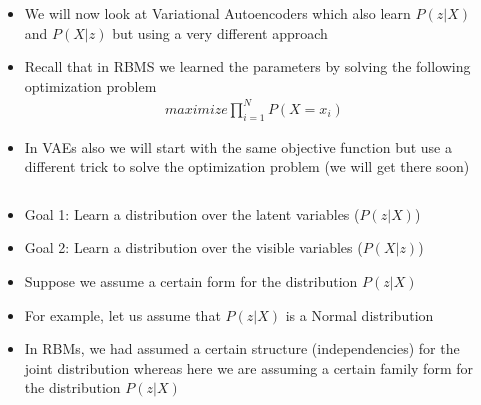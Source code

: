 \documentclass[serif,aspectratio=169,dvipsnames]{beamer}
\begin{document}
\begin{frame}
	\begin{columns}
		\begin{overlayarea}{\textwidth}{\textheight}
			\vspace{3pt}
			
		\end{overlayarea}
		\begin{overlayarea}{\textwidth}{\textheight}
			\begin{itemize}\justifying
				\item<1-> We will now look at Variational Autoencoders which also learn $P(z|X)$ and $P(X|z)$ but using a very different approach
				\item<2-> Recall that in RBMS we learned the parameters by solving the following optimization problem
				\begin{align*}
					maximize \prod_{i=1}^{N} P(X = x_i)
				\end{align*}
				\item<3-> In VAEs also we will start with the same objective function but use a different trick to solve the optimization problem (we will get there soon)
			\end{itemize}
		\end{overlayarea}
	\end{columns}
\end{frame}


\begin{frame}
	\begin{columns}
		\column{0.4\textwidth}
		\begin{overlayarea}{\textwidth}{\textheight}
			\vspace{3pt}
			
		\end{overlayarea}
		\column{0.6\textwidth}
		\begin{overlayarea}{\textwidth}{\textheight}
			\begin{itemize}\justifying
				\item<1-> Goal 1: Learn a distribution over the latent variables ($P(z|X)$)
				\item<2-> Goal 2: Learn a distribution over the visible variables ($P(X|z)$)
				\item<3-> Suppose we assume a certain form for the distribution $P(z|X)$ 
				\item<4-> For example, let us assume that $P(z|X)$ is a Normal distribution 
				\item<5-> In RBMs, we had assumed a certain structure (independencies) for the joint distribution whereas here we are assuming a certain family form for the distribution $P(z|X)$ 
			\end{itemize}
		\end{overlayarea}
	\end{columns}
\end{frame}
\end{document}
